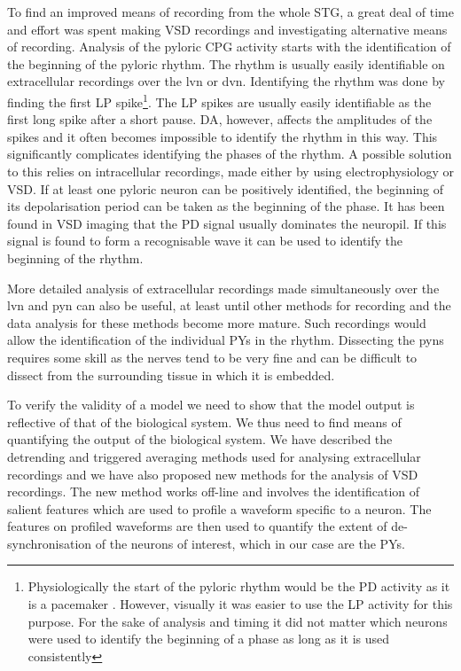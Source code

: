 To find an improved means of recording from the whole \ac{STG}, a great deal of time and effort was spent making \ac{VSD} recordings and investigating alternative means of recording. Analysis of the pyloric \ac{CPG} activity starts with the identification of the beginning of the pyloric rhythm. The rhythm is usually easily identifiable on extracellular recordings over the \ac{lvn} or \ac{dvn}. Identifying the rhythm was done by finding the first \ac{LP} spike\footnote{Physiologically the start of the pyloric rhythm would be the \ac{PD} activity as it is a pacemaker \cite{Harris-Warrick1992}. However, visually it was easier to use the \ac{LP} activity for this purpose. For the sake of analysis and timing it did not matter which neurons were used to identify the beginning of a phase as long as it is used consistently}. The \ac{LP} spikes are usually easily identifiable as the first long spike after a short pause. \ac{DA}, however, affects the amplitudes of the spikes and it often becomes impossible to identify the rhythm in this way. This significantly complicates identifying the phases of the rhythm. A possible solution to this relies on intracellular recordings, made either by using electrophysiology or \ac{VSD}. If at least one pyloric neuron can be positively identified, the beginning of its depolarisation period can be taken as the beginning of the phase. It has been found in \ac{VSD} imaging that the \ac{PD} signal usually dominates the neuropil. If this signal is found to form a recognisable wave it can be used to identify the beginning of the rhythm.

More detailed analysis of extracellular recordings made simultaneously over the \ac{lvn} and \ac{pyn} can also be useful, at least until other methods for recording and the data analysis for these methods become more mature. Such recordings would allow the identification of the individual \acp{PY} in the rhythm. Dissecting the \acp{pyn} requires some skill as the nerves tend to be very fine and can be difficult to dissect from the surrounding tissue in which it is embedded.

To verify the validity of a model we need to show that the model output is reflective of that of the biological system. We thus need to find means of quantifying the output of the biological system. We have described the detrending and triggered averaging methods used for analysing extracellular recordings and we have also proposed new methods for the analysis of \ac{VSD} recordings. The new method works off-line and involves the identification of salient features which are used to profile a waveform specific to a neuron. The features on  profiled waveforms are then used to quantify the extent of de-synchronisation of the neurons of interest, which in our case are the \acp{PY}.


